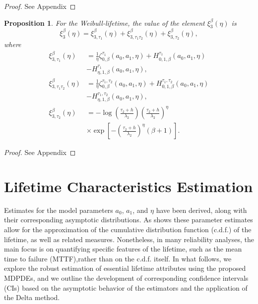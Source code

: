\documentclass{article}
\newtheorem{proposition}[theorem]{Proposition}
\begin{document}
\begin{proof}
See Appendix
\end{proof}
\begin{proposition}
For the Weibull-lifetime, the value of the element $\xi_{3}^{\beta}(\eta)$ is
\begin{equation*}
\xi_{3}^{\beta}(\eta)=\xi_{3,\tau_1}^{\beta}(\eta)+\xi_{3,\tau_1\tau_2}^{\beta}(\eta)+\xi_{3,\tau_2}^{\beta}(\eta),
\end{equation*}
where
\begin{equation}
\begin{aligned}
\xi_{3,\tau_1}^{\beta}(\eta)&=\frac{1}{\eta}\zeta_{0,\beta}^{\tau_1}(a_0,a_1,\eta)+H_{0,1,\beta}^{\tau_1}(a_0,a_1,\eta)
\\&-H_{\eta,1,\beta}^{\tau_1}(a_0,a_1,\eta),
\\
\xi_{3,\tau_1\tau_2}^{\beta}(\eta)&=\frac{1}{\eta}\zeta_{0,\beta}^{\tau_1,\tau_2}(a_0,a_1,\eta)+H_{0,1,\beta}^{\tau_1,\tau_2}(a_0,a_1,\eta)
\\&-H_{\eta,1,\beta}^{\tau_1,\tau_2}(a_0,a_1,\eta),
\\
\xi_{3,\tau_2}^{\beta}(\eta)&=-\log\left(\frac{\tau_2+h}{\lambda_2}\right)\left(\frac{\tau_2+h}{\lambda_2}\right)^{\eta}
\\
&\times \exp\left[-\left(\frac{\tau_2+h}{\lambda_2}\right)^{\eta}(\beta+1)\right].
\end{aligned}  \nonumber
\end{equation}
\end{proposition}
\begin{proof}
See Appendix
\end{proof}

\section{Lifetime Characteristics Estimation \label{sec:CI}}


Estimates for the model parameters $a_0$, $a_1$, and $\eta$ have been derived, along with their corresponding asymptotic distributions. As \cite{balakrishnan2025} shows these parameter estimates allow for the approximation of the cumulative distribution function (c.d.f.) of the lifetime, as well as related measures. Nonetheless, in many reliability analyses, the main focus is on quantifying specific features of the lifetime, such as the mean time to failure (MTTF),rather than on the c.d.f. itself. In what follows, we explore the robust estimation of essential lifetime attributes using the proposed MDPDEs, and we outline the development of corresponding confidence intervals (CIs) based on the asymptotic behavior of the estimators and the application of the Delta method.
\end{document}
